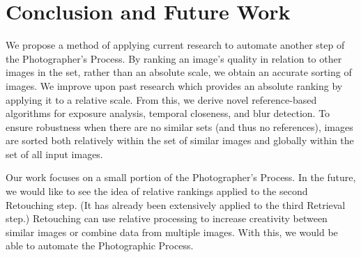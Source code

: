 \documentclass[twocolumn]{article}
\begin{document}
\section{Conclusion and Future Work}
We propose a method of applying current research to automate another step of the Photographer's Process. By ranking an image's quality in relation to other images in the set, rather than an absolute scale, we obtain an accurate sorting of images. We improve upon past research which provides an absolute ranking by applying it to a relative scale. From this, we derive novel reference-based algorithms for exposure analysis, temporal closeness, and blur detection. To ensure robustness when there are no similar sets (and thus no references), images are sorted both relatively within the set of similar images and globally within the set of all input images.

Our work focuses on a small portion of the Photographer's Process. In the future, we would like to see the idea of relative rankings applied to the second Retouching step. (It has already been extensively applied to the third Retrieval step.) Retouching can use relative processing to increase creativity between similar images or combine data from multiple images. With this, we would be able to automate the Photographic Process.


\end{document}
